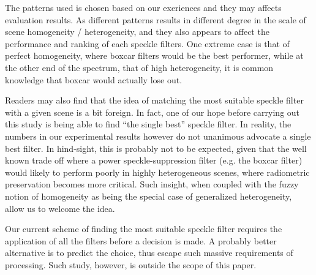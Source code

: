 \documentclass[journal]{IEEEtran}
\begin{document}
The patterns used is chosen based on our exeriences and they may affects evaluation results. 
As different patterns results in different degree in the scale of scene homogeneity / heterogeneity, 
	and they also appears to affect the performance and ranking of each speckle filters.
One extreme case is that of perfect homogeneity, where boxcar filters would be the best performer,
	while at the other end of the spectrum, that of high heterogeneity, it is common knowledge that boxcar would actually lose out.


Readers may also find that the idea of matching the most suitable speckle filter with a given scene is a bit foreign.
In fact, one of our hope before carrying out this study is being able to find ``the single best'' speckle filter.
In reality, the numbers in our experimental results however do not unanimous advocate a single best filter. 
In hind-sight, this is probably not to be expected,
	given that the well known trade off where a power speckle-suppression filter (e.g. the boxcar filter) would likely to perform poorly in highly heterogeneous scenes, where radiometric preservation becomes more critical.
Such insight, when coupled with the fuzzy notion of homogeneity as being the special case of generalized heterogeneity, allow us to welcome the idea.

Our current scheme of finding the most suitable speckle filter requires the application of all the filters before a decision is made.
A probably better alternative is to predict the choice, thus escape such massive requirements of processing.
Such study, however, is outside the scope of this paper.
\end{document}
